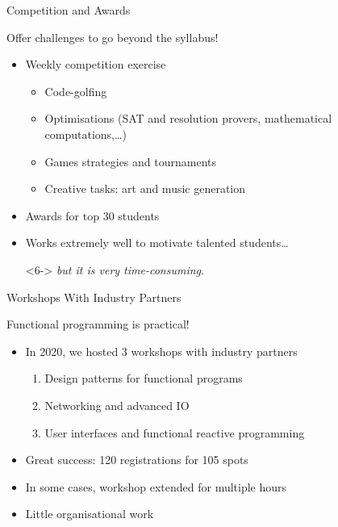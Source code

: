 \documentclass{beamer}
\begin{document}
\begin{frame}[fragile]{Competition and Awards}
\centerline{\Large{\alert{Offer challenges to go beyond the syllabus!}}}
\pause
\begin{itemize}
\item<2-> Weekly competition exercise
\begin{itemize}[<3->]
  \item Code-golfing
  \item Optimisations (SAT and resolution provers, mathematical computations,\dots)
  \item Games strategies and tournaments
  \item Creative tasks: art and music generation
\end{itemize}
\item<4-> Awards for top 30 students
\item<5-> Works extremely well to motivate talented students\dots
\item[]<6-> \emph{but it is very time-consuming}.
\end{itemize}
\end{frame}

\begin{frame}{Workshops With Industry Partners}
\vspace{\baselineskip}

\centerline{\Large{\alert{Functional programming is practical!}}}
\pause
\begin{itemize}
\item In 2020, we hosted 3 workshops with industry partners
\begin{enumerate}[<3->]
  \item Design patterns for functional programs
  \item Networking and advanced IO
  \item User interfaces and functional reactive programming
\end{enumerate}
\item<4-> Great success: 120 registrations for 105 spots
\item<5-> In some cases, workshop extended for multiple hours
\item<6-> Little organisational work
\end{itemize}
\end{frame}
\end{document}
